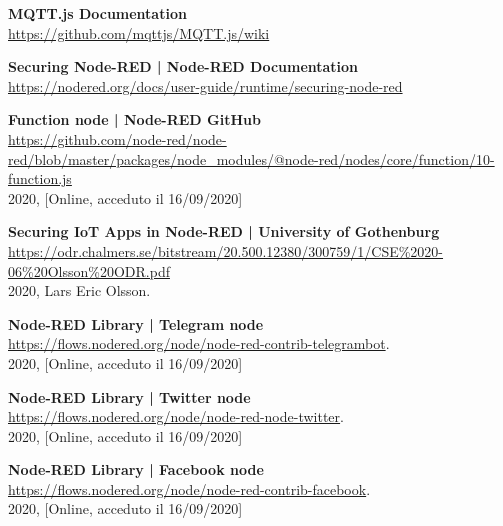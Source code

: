 \documentclass[a4paper,10pt]{memoir}
\begin{document}
\begin{thebibliography}{9}
    \textbf{MQTT.js Documentation}
    \\
    \href{https://github.com/mqttjs/MQTT.js/wiki}{https://github.com/mqttjs/MQTT.js/wiki}

    \textbf{Securing Node-RED | Node-RED Documentation}
    \\
    \href{https://nodered.org/docs/user-guide/runtime/securing-node-red}{https://nodered.org/docs/user-guide/runtime/securing-node-red}
    
    \textbf{Function node | Node-RED GitHub}
    \\
    \href{https://github.com/node-red/node-red/blob/master/packages/node\_modules/@node-red/nodes/core/function/10-function.js}{https://github.com/node-red/node-red/blob/master/packages/node\_modules/@node-red/nodes/core/function/10-function.js}
    \\
    2020, [Online, acceduto il 16/09/2020]

    \textbf{Securing IoT Apps in Node-RED | University of Gothenburg}
    \\
    \href{https://odr.chalmers.se/bitstream/20.500.12380/300759/1/CSE\%2020-06\%20Olsson\%20ODR.pdf}{https://odr.chalmers.se/bitstream/20.500.12380/300759/1/CSE\%2020-06\%20Olsson\%20ODR.pdf}
    \\
    2020, Lars Eric Olsson.
    
    \textbf{Node-RED Library | Telegram node}
    \\
    \href{https://flows.nodered.org/node/node-red-contrib-telegrambot}{https://flows.nodered.org/node/node-red-contrib-telegrambot}.
    \\
    2020, [Online, acceduto il 16/09/2020]
    
    \textbf{Node-RED Library | Twitter node}
    \\
    \href{https://flows.nodered.org/node/node-red-node-twitter}{https://flows.nodered.org/node/node-red-node-twitter}.
    \\
    2020, [Online, acceduto il 16/09/2020]
    
    \textbf{Node-RED Library | Facebook node}
    \\
    \href{https://flows.nodered.org/node/node-red-contrib-facebook}{https://flows.nodered.org/node/node-red-contrib-facebook}.
    \\
    2020, [Online, acceduto il 16/09/2020]


\end{thebibliography}
\end{document}
